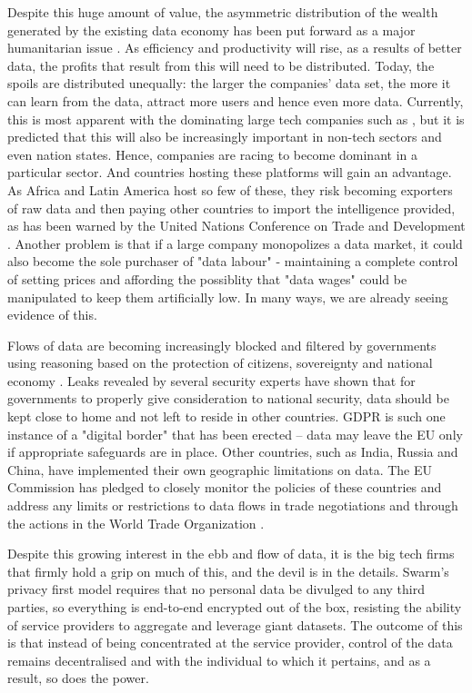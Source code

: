 Despite this huge amount of value, the asymmetric distribution of the wealth generated by the existing data economy has been put forward as a major humanitarian issue \cite{TheWinner2020Feb}. As efficiency and productivity will rise, as a results of better data, the profits that result from this will need to be distributed. Today, the spoils are distributed unequally: the larger the companies' data set, the more it can learn from the data, attract more users and hence even more data. Currently, this is most apparent with the dominating large tech companies such as , but it is predicted that this will also be increasingly important in non-tech sectors and even nation states. Hence, companies are racing to become dominant in a particular sector. And countries hosting these platforms will gain an advantage. As Africa and Latin America host so few of these, they risk becoming exporters of raw data and then paying other countries to import the intelligence provided, as has been warned by the United Nations Conference on Trade and Development \cite{TheWinner2020Feb}. Another problem is that if a large company monopolizes a data market, it could also become the sole purchaser of "data labour" - maintaining a complete control of setting prices and affording the possiblity that "data wages" could be manipulated to keep them artificially low. In many ways, we are already seeing evidence of this. 


Flows of data are becoming increasingly blocked and filtered by governments using reasoning based on the protection of citizens, sovereignty and national economy \cite{VirtualNationalism2020Feb}. Leaks revealed by several security experts have shown that for governments to properly give consideration to national security,  data should be kept close to home and not left to reside in other countries. GDPR is such one instance of a "digital border" that has been erected -- data may leave the EU only if appropriate safeguards are in place. Other countries, such as India, Russia and China, have implemented their own geographic limitations on data. The EU Commission has pledged to closely monitor the policies of these countries and address any limits or restrictions to data flows in trade negotiations and through the actions in the World Trade Organization \cite{EUWhitePaperAI2020Feb}.

Despite this growing interest in the ebb and flow of data, it is the big tech firms that firmly hold a grip on much of this, and the devil is in the details. Swarm's privacy first model requires that no personal data be divulged to any third parties, so everything is end-to-end encrypted out of the box, resisting the ability of service providers to aggregate and leverage giant datasets. The outcome of this is that instead of being concentrated at the service provider, control of the data remains decentralised and with the individual to which it pertains, and as a result, so does the power.

